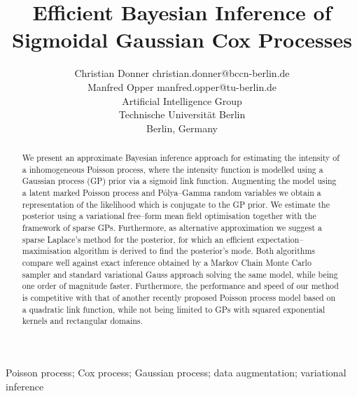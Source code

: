 \documentclass[twoside,11pt]{article}
\begin{document}
\title{Efficient Bayesian Inference of Sigmoidal Gaussian Cox Processes}

\author{\name Christian Donner \email christian.donner@bccn-berlin.de \\
		\name Manfred Opper \email manfred.opper@tu-berlin.de \\
       \addr Artificial Intelligence Group\\
       Technische Universit\"at Berlin\\
       Berlin, Germany}


\maketitle

\begin{abstract}%
We present an approximate Bayesian inference approach for estimating the intensity
of a inhomogeneous Poisson process, where the intensity function is modelled using a Gaussian process (GP) prior via a sigmoid link function. Augmenting the model using a latent marked Poisson process and P\'olya--Gamma random variables we obtain a representation of the likelihood which is conjugate to the GP prior. We estimate the posterior using a variational free--form mean field optimisation together with the framework of sparse GPs. Furthermore, as alternative approximation we suggest a sparse Laplace's method for the posterior, for which an efficient expectation--maximisation algorithm is derived to find the posterior's mode. Both algorithms compare well against exact inference obtained by a Markov Chain Monte Carlo sampler and standard variational Gauss approach solving the same model, while being one order of magnitude faster. Furthermore, the performance and speed of our method is competitive with that of another recently proposed Poisson process model based on a quadratic link function, while not being limited to GPs with squared exponential kernels and rectangular domains.
\end{abstract}

\begin{keywords}
Poisson process; Cox process; Gaussian process; data augmentation; variational inference
\end{keywords}
\end{document}
